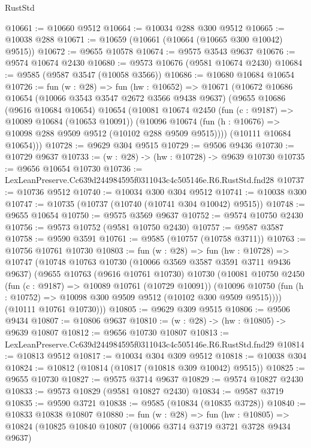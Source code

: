 \begin{lexlean}{RustStd}
\begin{coremodule}
@10661 := @10660 @9512
@10664 := @10034 @288 @300 @9512
@10665 := @10038 @288
@10671 := @10659 (@10661 (@10664 (@10665 @300 @10042) @9515))
@10672 := @9655 @10578
@10674 := @9575 @3543 @9637
@10676 := @9574 @10674 @2430
@10680 := @9573 @10676 (@9581 @10674 @2430)
@10684 := @9585 (@9587 @3547 (@10058 @3566))
@10686 := @10680 @10684 @10654
@10726 := fun (w : @28) =>
  fun (hw : @10652) =>
  @10671
    (@10672
      @10686
      @10654
      (@10066 @3543 @3547 @2672 @3566 @9438 @9637)
      (@9655
        @10686
        (@9616 @10684 @10654)
        @10654
        (@10081
          @10674
          @2450
          (fun (c : @9187) => @10089 @10684 (@10653 @10091))
          (@10096 @10674 (fun (h : @10676) => @10098 @288 @9509 @9512 (@10102 @288 @9509 @9515))))
        (@10111 @10684 @10654)))
@10728 := @9629 @304 @9515
@10729 := @9506 @9436
@10730 := @10729 @9637
@10733 := (w : @28) -> (hw : @10728) -> @9639 @10730
@10735 := @9656 @10654 @10730
@10736 := LexLeanPreserve.Cc639d244984595f0311043c4c505146e.R6.RustStd.fnd28
@10737 := @10736 @9512
@10740 := @10034 @300 @304 @9512
@10741 := @10038 @300
@10747 := @10735 (@10737 (@10740 (@10741 @304 @10042) @9515))
@10748 := @9655 @10654
@10750 := @9575 @3569 @9637
@10752 := @9574 @10750 @2430
@10756 := @9573 @10752 (@9581 @10750 @2430)
@10757 := @9587 @3587
@10758 := @9590 @3591
@10761 := @9585 (@10757 (@10758 @3711))
@10763 := @10756 @10761 @10730
@10803 := fun (w : @28) =>
  fun (hw : @10728) =>
  @10747
    (@10748
      @10763
      @10730
      (@10066 @3569 @3587 @3591 @3711 @9436 @9637)
      (@9655
        @10763
        (@9616 @10761 @10730)
        @10730
        (@10081
          @10750
          @2450
          (fun (c : @9187) => @10089 @10761 (@10729 @10091))
          (@10096 @10750 (fun (h : @10752) => @10098 @300 @9509 @9512 (@10102 @300 @9509 @9515))))
        (@10111 @10761 @10730)))
@10805 := @9629 @309 @9515
@10806 := @9506 @9434
@10807 := @10806 @9637
@10810 := (w : @28) -> (hw : @10805) -> @9639 @10807
@10812 := @9656 @10730 @10807
@10813 := LexLeanPreserve.Cc639d244984595f0311043c4c505146e.R6.RustStd.fnd29
@10814 := @10813 @9512
@10817 := @10034 @304 @309 @9512
@10818 := @10038 @304
@10824 := @10812 (@10814 (@10817 (@10818 @309 @10042) @9515))
@10825 := @9655 @10730
@10827 := @9575 @3714 @9637
@10829 := @9574 @10827 @2430
@10833 := @9573 @10829 (@9581 @10827 @2430)
@10834 := @9587 @3719
@10835 := @9590 @3721
@10838 := @9585 (@10834 (@10835 @3728))
@10840 := @10833 @10838 @10807
@10880 := fun (w : @28) =>
  fun (hw : @10805) =>
  @10824
    (@10825
      @10840
      @10807
      (@10066 @3714 @3719 @3721 @3728 @9434 @9637)

\end{coremodule}
\end{lexlean}
